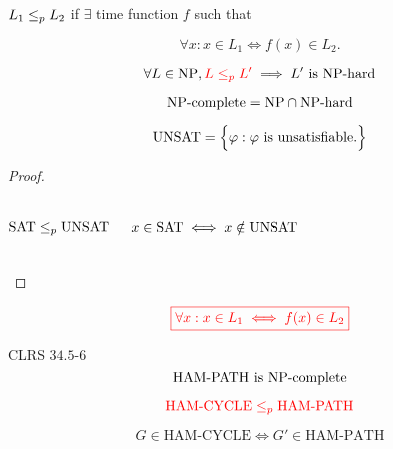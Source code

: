 
\begin{frame}
  \begin{definition}
	\begin{center}
	  $L_1 \le_{p} L_2$ if $\exists$  time function $f$ such that
	\end{center}
	\[
	  \forall x: x \in L_1 \iff f(x) \in L_2.
	\]
  \end{definition}

  \pause
  \vspace{0.30cm}
  \[
	\forall L \in \text{NP}, \textcolor{red}{L \le_{p} L'} \implies L' \text{ is } \text{NP-hard}
  \]

  \[
	\text{NP-complete} = \text{NP} \cap \text{NP-hard}
  \]
\end{frame}

\begin{frame}
  \[
	\text{UNSAT} = \Big\{ \varphi: \varphi \text{ is unsatisfiable.} \Big\}
  \]

  \begin{center}
  \end{center}

  \pause
  \begin{proof}
	\begin{columns}
		\pause
		\[
		  \text{SAT} \le_{p} \text{UNSAT}
		\]

		\pause
		\[
		  x \in \text{SAT} \iff x \notin \text{UNSAT}
		\]
		\pause
	\end{columns}
  \end{proof}

  \pause
  \[
	\textcolor{red}{\boxed{\forall x: x \in L_1 \iff f(x) \in L_2}}
  \]
\end{frame}

\begin{frame}
  \begin{exampleblock}{CLRS $34.5$-$6$}
	\[
	  \text{HAM-PATH is } \text{NP-complete}
	\]
  \end{exampleblock}

  \pause
  \[
	\textcolor{red}{\text{HAM-CYCLE} \le_{p} \text{HAM-PATH}}
  \]

  \pause
  \begin{center}
	\resizebox{0.50\textwidth}{!}{}
  \end{center}

  \pause
  \vspace{-0.30cm}
  \[
	G \in \text{HAM-CYCLE} \iff G' \in \text{HAM-PATH}
  \]
\end{frame}

